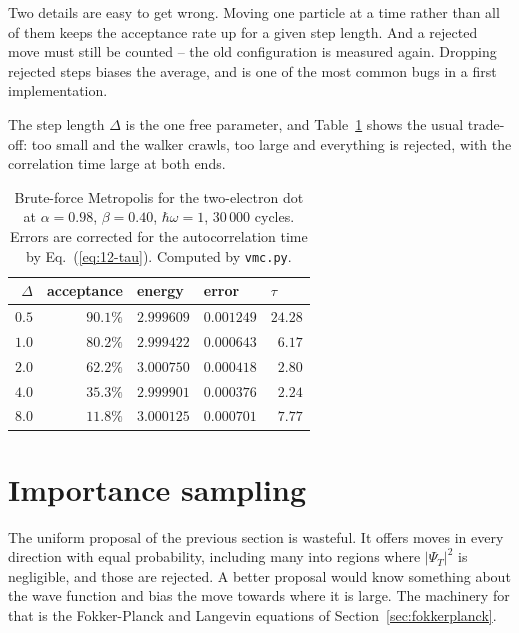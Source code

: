 \noindent
Two details are easy to get wrong.  Moving one particle at a time rather than
all of them keeps the acceptance rate up for a given step length.  And a
rejected move must still be counted -- the old configuration is measured
again.  Dropping rejected steps biases the average, and is one of the most
common bugs in a first implementation.

The step length $\Delta$ is the one free parameter, and
Table~\ref{tab:13-brute} shows the usual trade-off: too small and the walker
crawls, too large and everything is rejected, with the correlation time large
at both ends.

\begin{table}[h]
\centering
\renewcommand{\arraystretch}{1.25}
\setlength{\tabcolsep}{11pt}
\begin{tabular}{rrlll}
\toprule
$\Delta$ & acceptance & energy & error & $\tau$\\
\midrule
$0.5$ & $90.1\%$ & $2.999609$ & $0.001249$ & $24.28$\\
$1.0$ & $80.2\%$ & $2.999422$ & $0.000643$ & $\phantom{0}6.17$\\
$2.0$ & $62.2\%$ & $3.000750$ & $0.000418$ & $\phantom{0}2.80$\\
$4.0$ & $35.3\%$ & $2.999901$ & $0.000376$ & $\phantom{0}2.24$\\
$8.0$ & $11.8\%$ & $3.000125$ & $0.000701$ & $\phantom{0}7.77$\\
\bottomrule
\end{tabular}
\caption{Brute-force Metropolis for the two-electron dot at $\alpha=0.98$,
$\beta=0.40$, $\hbar\omega=1$, $30\,000$ cycles.  Errors are corrected for the
autocorrelation time by Eq.~(\ref{eq:12-tau}).  Computed by \texttt{vmc.py}.}
\label{tab:13-brute}
\end{table}

\section{Importance sampling}
\label{sec:vmcimportance}

The uniform proposal of the previous section is wasteful.  It offers moves in
every direction with equal probability, including many into regions where
$|\Psi_T|^2$ is negligible, and those are rejected.  A better proposal would
know something about the wave function and bias the move towards where it is
large.  The machinery for that is the Fokker-Planck and Langevin equations of
Section~\ref{sec:fokkerplanck}.

